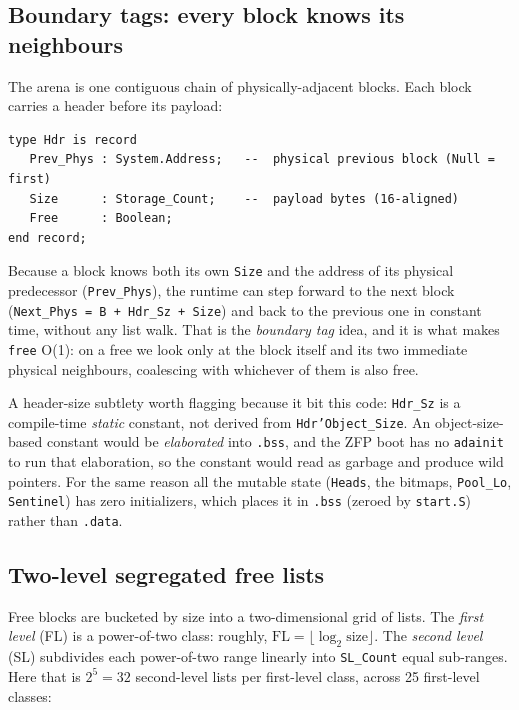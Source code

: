 \subsection{Boundary tags: every block knows its neighbours}

The arena is one contiguous chain of physically-adjacent blocks. Each block
carries a header before its payload:

\begin{lstlisting}
type Hdr is record
   Prev_Phys : System.Address;   --  physical previous block (Null = first)
   Size      : Storage_Count;    --  payload bytes (16-aligned)
   Free      : Boolean;
end record;
\end{lstlisting}

Because a block knows both its own \texttt{Size} and the address of its physical
predecessor (\texttt{Prev\_Phys}), the runtime can step forward to the next block
(\texttt{Next\_Phys = B + Hdr\_Sz + Size}) and back to the previous one in
constant time, without any list walk. That is the \emph{boundary tag} idea, and
it is what makes \texttt{free} O(1): on a free we look only at the block itself
and its two immediate physical neighbours, coalescing with whichever of them is
also free.

A header-size subtlety worth flagging because it bit this code: \texttt{Hdr\_Sz}
is a compile-time \emph{static} constant, not derived from
\texttt{Hdr'Object\_Size}. An object-size-based constant would be \emph{elaborated}
into \texttt{.bss}, and the ZFP boot has no \texttt{adainit} to run that
elaboration, so the constant would read as garbage and produce wild pointers.
For the same reason all the mutable state (\texttt{Heads}, the bitmaps,
\texttt{Pool\_Lo}, \texttt{Sentinel}) has zero initializers, which places it in
\texttt{.bss} (zeroed by \texttt{start.S}) rather than \texttt{.data}.

\subsection{Two-level segregated free lists}

Free blocks are bucketed by size into a two-dimensional grid of lists. The
\emph{first level} (FL) is a power-of-two class: roughly, $\mathrm{FL} =
\lfloor\log_2 \mathrm{size}\rfloor$. The \emph{second level} (SL) subdivides each
power-of-two range linearly into \texttt{SL\_Count} equal sub-ranges. Here that is
$2^5 = 32$ second-level lists per first-level class, across 25 first-level
classes:

